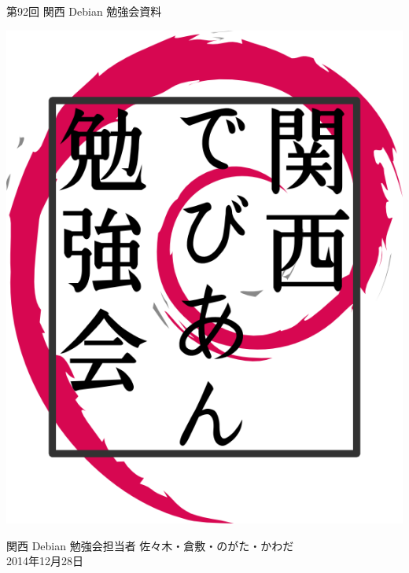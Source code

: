 \documentclass[mingoth,a4paper]{jsarticle}
\newcommand{\debmtgyear}{2014}
\newcommand{\debmtgdate}{28}
\newcommand{\debmtgmonth}{12}
\newcommand{\debmtgnumber}{92}
\begin{document}
\begin{titlepage}


 第\debmtgnumber{}回 関西 Debian 勉強会資料

\vspace{2cm}

\begin{center}
\includegraphics{image200802/kansaidebianlogo.png}
\end{center}

\begin{flushright}
\hfill{}関西 Debian 勉強会担当者 佐々木・倉敷・のがた・かわだ \\
\hfill{}\debmtgyear{}年\debmtgmonth{}月\debmtgdate{}日
\end{flushright}

\thispagestyle{empty}
\end{titlepage}


\vspace{1em}
\end{document}
